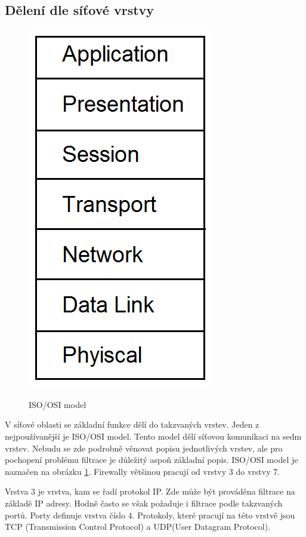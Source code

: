 \documentclass[11pt,a4paper]{article}
\begin{document}
\subsection{Dělení dle síťové vrstvy}

\begin{figure}
	\center
	\includegraphics[scale=0.25]{./pict/osi.png}
	\label{pic:osi_model}
	\caption{ISO/OSI model \cite{ref:osi}}
\end{figure}

V síťové oblasti se základní funkce dělí do takzvaných vrstev. Jeden z nejpoužívanější je ISO/OSI model. Tento model dělí síťovou komunikaci na sedm vrstev. Nebudu se zde podrobně věnovat popisu jednotlivých vrstev, ale pro pochopení problému filtrace je důležitý aspoň základní popis. ISO/OSI model je naznačen na obrázku \ref{pic:osi_model}. Firewally většinou pracují od vrstvy 3 do vrstvy 7. 


Vrstva 3 je vrstva, kam se řadí protokol IP. Zde může být prováděna filtrace na základě IP adresy. Hodně často se však požaduje i filtrace podle takzvaných portů. Porty definuje vrstva číslo 4. Protokoly, které pracují na této vrstvě jsou TCP (Transmission Control Protocol) a UDP(User Datagram Protocol). 
\end{document}
